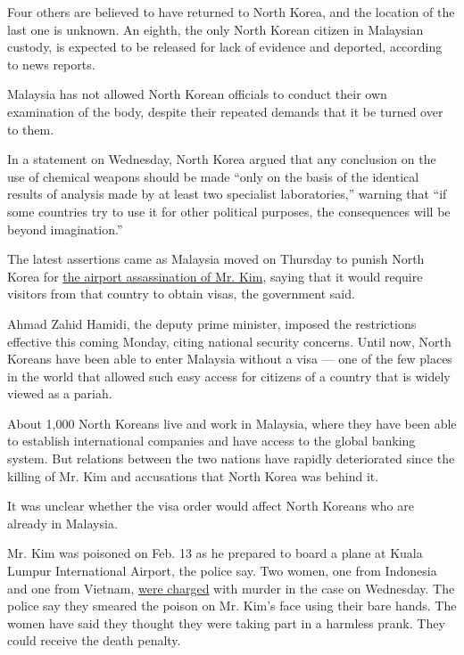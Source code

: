Four others are believed to have returned to North Korea, and the
location of the last one is unknown. An eighth, the only North Korean
citizen in Malaysian custody, is expected to be released for lack of
evidence and deported, according to news reports.

Malaysia has not allowed North Korean officials to conduct their own
examination of the body, despite their repeated demands that it be
turned over to them.

In a statement on Wednesday, North Korea argued that any conclusion on
the use of chemical weapons should be made ``only on the basis of the
identical results of analysis made by at least two specialist
laboratories,'' warning that ``if some countries try to use it for other
political purposes, the consequences will be beyond imagination.''

The latest assertions came as Malaysia moved on Thursday to punish North
Korea for
\href{https://www.nytimes3xbfgragh.onion/2017/02/22/world/asia/kim-jong-nam-assassination-korea-malaysia.html}{the
airport assassination of Mr. Kim}, saying that it would require visitors
from that country to obtain visas, the government said.

Ahmad Zahid Hamidi, the deputy prime minister, imposed the restrictions
effective this coming Monday, citing national security concerns. Until
now, North Koreans have been able to enter Malaysia without a visa ---
one of the few places in the world that allowed such easy access for
citizens of a country that is widely viewed as a pariah.

About 1,000 North Koreans live and work in Malaysia, where they have
been able to establish international companies and have access to the
global banking system. But relations between the two nations have
rapidly deteriorated since the killing of Mr. Kim and accusations that
North Korea was behind it.

It was unclear whether the visa order would affect North Koreans who are
already in Malaysia.

Mr. Kim was poisoned on Feb. 13 as he prepared to board a plane at Kuala
Lumpur International Airport, the police say. Two women, one from
Indonesia and one from Vietnam,
\href{https://www.nytimes3xbfgragh.onion/2017/02/28/world/asia/north-korea-kim-jong-nam-death.html}{were
charged} with murder in the case on Wednesday. The police say they
smeared the poison on Mr. Kim's face using their bare hands. The women
have said they thought they were taking part in a harmless prank. They
could receive the death penalty.


